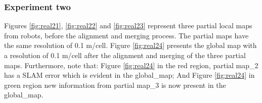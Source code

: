 \subsubsection{Experiment two} %

Figures \ref{fig:real21}, \ref{fig:real22} and \ref{fig:real23} represent three partial local maps from robots, before the alignment and merging process. The partial maps have the same resolution of 0.1 m/cell. Figure \ref{fig:real24} presents the global map with a resolution of 0.1 m/cell after the alignment and merging of the three partial maps. Furthermore, note that: Figure \ref{fig:real24} in the red region, partial map\_2 has a SLAM error which is evident in the global\_map; And Figure \ref{fig:real24} in green region new information from partial map\_3 is now present in the global\_map.

